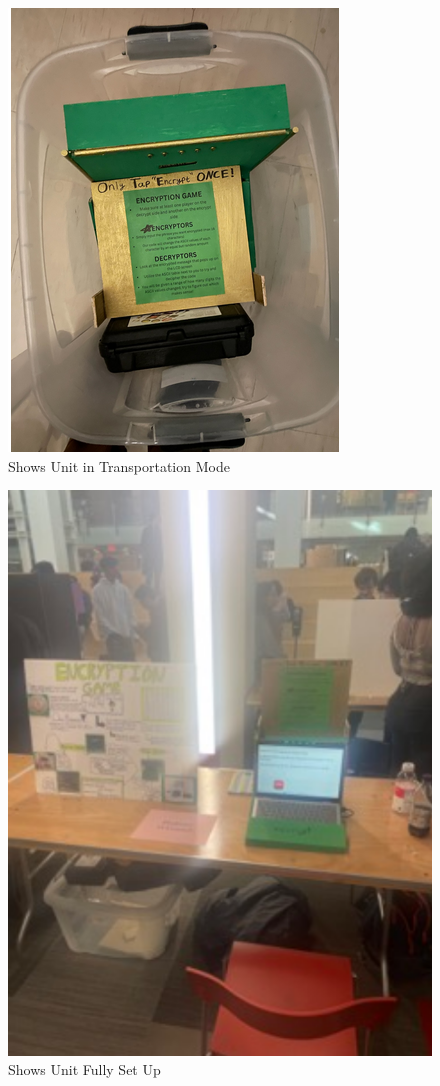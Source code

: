 \documentclass[conference]{IEEEtran}
\begin{document}
 \begin{figure}[H]
   \centering
   \includegraphics[width=.9\textwidth]{Figures/Log/PhotoLog1.png}
   \caption{Shows Unit in Transportation Mode}
 \end{figure}
 \begin{figure}[H]
   \centering
   \includegraphics[width=.9\textwidth]{Figures/Log/PhotoLog2.png}
   \caption{Shows Unit Fully Set Up}
 \end{figure}
\end{document}
